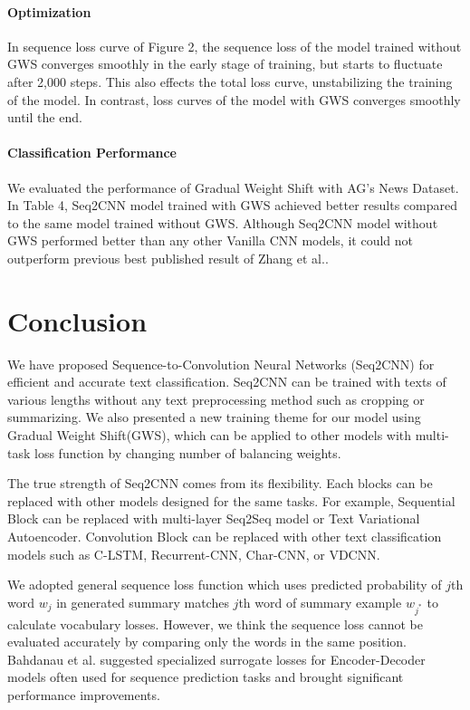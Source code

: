 \documentclass{article}
\begin{document}
\paragraph{Optimization}In sequence loss curve of Figure 2, the sequence loss of the model trained without GWS converges smoothly in the early stage of training, but starts to fluctuate after 2,000 steps. This also effects the total loss curve, unstabilizing the training of the model. In contrast, loss curves of the model with GWS converges smoothly until the end. 

\paragraph{Classification Performance}We evaluated the performance of Gradual Weight Shift with AG's News Dataset. In Table 4, Seq2CNN model trained with GWS achieved better results compared to the same model trained without GWS. Although Seq2CNN model without GWS performed better than any other Vanilla CNN models, it could not outperform previous best published result of Zhang et al.\cite{DBLP:journals/corr/ZhangZL15}.   

\section{Conclusion}
We have proposed Sequence-to-Convolution Neural Networks (Seq2CNN) for efficient and accurate text classification. Seq2CNN can be trained with texts of various lengths without any text preprocessing method such as cropping or summarizing. We also presented a new training theme for our model using Gradual Weight Shift(GWS), which can be applied to other models with multi-task loss function by changing number of balancing weights.

The true strength of Seq2CNN comes from its flexibility. Each blocks can be replaced with other models designed for the same tasks. For example, Sequential Block can be replaced with multi-layer Seq2Seq model\cite{tensorflow2015-whitepaper} or Text Variational Autoencoder\cite{DBLP:journals/corr/SemeniutaSB17}. Convolution Block can be replaced with other text classification models such as C-LSTM\cite{DBLP:journals/corr/ZhouSLL15b}, Recurrent-CNN\cite{AAAI159745}, Char-CNN\cite{DBLP:journals/corr/ZhangZL15}, or VDCNN\cite{DBLP:journals/corr/ConneauSBL16}.

We adopted general sequence loss function which uses predicted probability of $j$th word $w_j$ in generated summary matches $j$th word of summary example $w_{j^*}$ to calculate vocabulary losses. However, we think the sequence loss cannot be evaluated accurately by comparing only the words in the same position. Bahdanau et al.\cite{DBLP:journals/corr/BahdanauSBKCCB15} suggested specialized surrogate losses for Encoder-Decoder models often used for sequence prediction tasks and brought significant performance improvements.
\end{document}
